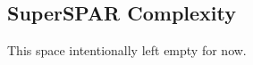 \documentclass{ucalgthes1}
\theoremstyle{definition}
\DeclareMathOperator{\ord}{ord}
\newcommand{\ideal}{\mathfrak}
\newcommand{\idealclass}[1]{\left[ \ideal #1 \right]}
\newcommand{\aclass}{\idealclass a}
\begin{document}
\subsection{SuperSPAR Complexity}


This space intentionally left empty for now.

\end{document}
